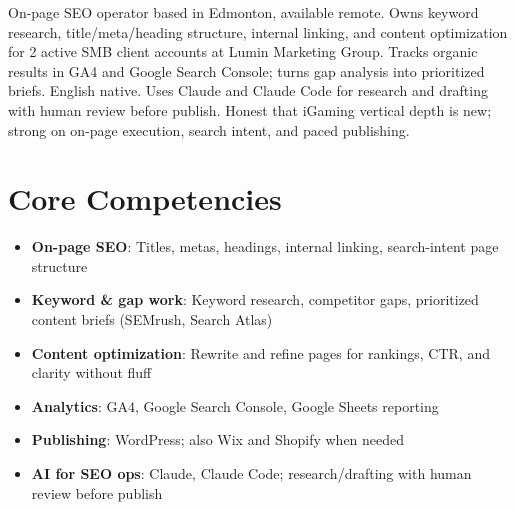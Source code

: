 \documentclass[11pt,a4paper,sans]{moderncv}
\begin{document}
\makecvtitle

\vspace{6pt}
\small{On-page SEO operator based in Edmonton, available remote. Owns keyword research, title/meta/heading structure, internal linking, and content optimization for 2 active SMB client accounts at Lumin Marketing Group. Tracks organic results in GA4 and Google Search Console; turns gap analysis into prioritized briefs. English native. Uses Claude and Claude Code for research and drafting with human review before publish. Honest that iGaming vertical depth is new; strong on on-page execution, search intent, and paced publishing.}

\section{Core Competencies}
\vspace{1pt}
\begin{itemize}
\item \textbf{On-page SEO}: Titles, metas, headings, internal linking, search-intent page structure
\item \textbf{Keyword \& gap work}: Keyword research, competitor gaps, prioritized content briefs (SEMrush, Search Atlas)
\item \textbf{Content optimization}: Rewrite and refine pages for rankings, CTR, and clarity without fluff
\item \textbf{Analytics}: GA4, Google Search Console, Google Sheets reporting
\item \textbf{Publishing}: WordPress; also Wix and Shopify when needed
\item \textbf{AI for SEO ops}: Claude, Claude Code; research/drafting with human review before publish
\end{itemize}
\end{document}
